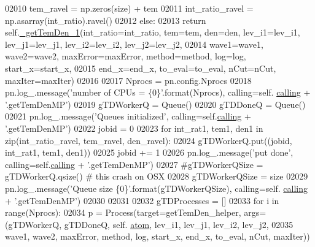 \begin{DoxyCode}
{{02010                 tem\_ravel = np.zeros(size) + tem
02011             int\_ratio\_ravel = np.asarray(int\_ratio).ravel()
02012         \textcolor{keywordflow}{else}:
02013             \textcolor{keywordflow}{return} self.\hyperlink{classpyneb_1_1core_1_1pynebcore_1_1_atom_ad1d75f64b27a6acee079b5738b69dabe}{\_getTemDen\_1}(int\_ratio=int\_ratio, tem=tem, den=den, lev\_i1=lev\_i1, 
      lev\_j1=lev\_j1, lev\_i2=lev\_i2, lev\_j2=lev\_j2,
02014                   wave1=wave1, wave2=wave2, maxError=maxError, method=method, log=log, start\_x=start\_x,
02015                   end\_x=end\_x, to\_eval=to\_eval, nCut=nCut, maxIter=maxIter)
02016         
02017         Nprocs = pn.config.Nprocs
02018         pn.log\_.message(\textcolor{stringliteral}{'number of CPUs = \{0\}'}.format(Nprocs), calling=self.
      \hyperlink{classpyneb_1_1core_1_1pynebcore_1_1_atom_a373b7735acf4f528b54bddf373ad67a1}{calling} + \textcolor{stringliteral}{'.getTemDenMP'})
02019         gTDWorkerQ = Queue()
02020         gTDDoneQ = Queue()
02021         pn.log\_.message(\textcolor{stringliteral}{'Queues initialized'}, calling=self.\hyperlink{classpyneb_1_1core_1_1pynebcore_1_1_atom_a373b7735acf4f528b54bddf373ad67a1}{calling} + \textcolor{stringliteral}{'.getTemDenMP'})
02022         jobid = 0
02023         \textcolor{keywordflow}{for} int\_rat1, tem1, den1 \textcolor{keywordflow}{in} zip(int\_ratio\_ravel, tem\_ravel, den\_ravel):
02024             gTDWorkerQ.put((jobid, int\_rat1, tem1, den1))
02025             jobid += 1
02026         pn.log\_.message(\textcolor{stringliteral}{'put done'}, calling=self.\hyperlink{classpyneb_1_1core_1_1pynebcore_1_1_atom_a373b7735acf4f528b54bddf373ad67a1}{calling} + \textcolor{stringliteral}{'.getTemDenMP'})
02027         \textcolor{comment}{#gTDWorkerQSize = gTDWorkerQ.qsize() # this crash on OSX}
02028         gTDWorkerQSize = size
02029         pn.log\_.message(\textcolor{stringliteral}{'Queue size \{0\}'}.format(gTDWorkerQSize), calling=self.
      \hyperlink{classpyneb_1_1core_1_1pynebcore_1_1_atom_a373b7735acf4f528b54bddf373ad67a1}{calling} + \textcolor{stringliteral}{'.getTemDenMP'})
02030 
02031         
02032         gTDProcesses = []
02033         \textcolor{keywordflow}{for} i \textcolor{keywordflow}{in} range(Nprocs):
02034             p = Process(target=getTemDen\_helper, args=(gTDWorkerQ, gTDDoneQ, self.
      \hyperlink{classpyneb_1_1core_1_1pynebcore_1_1_atom_a192f3e20446d7fba81d789bc705d6c71}{atom}, lev\_i1, lev\_j1, lev\_i2, lev\_j2,
02035                   wave1, wave2, maxError, method, log, start\_x, end\_x, to\_eval, nCut, maxIter))
}}
\end{DoxyCode}
